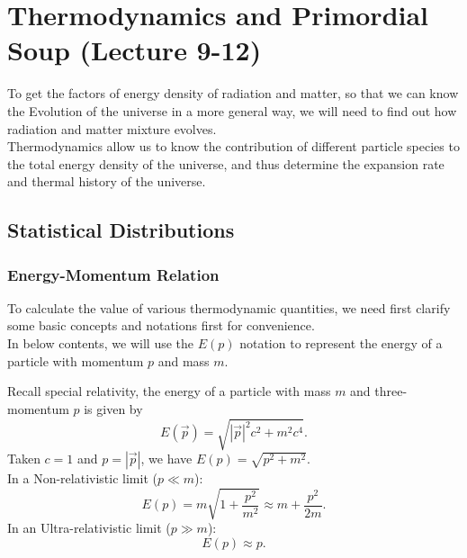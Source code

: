 
\chapter{Thermodynamics and Primordial Soup (Lecture 9-12)}
\quad To get the factors of energy density of radiation and matter, so that we can know the Evolution of the universe in a more general way, we will need to find out how radiation and matter mixture evolves.\\

Thermodynamics allow us to know the contribution of different particle species to the total energy density of the universe, and thus determine the expansion rate and thermal history of the universe.\\

\section{Statistical Distributions}
\subsection{Energy-Momentum Relation}
To calculate the value of various thermodynamic quantities, we need first clarify some basic concepts and notations first for convenience. \\

In below contents, we will use the $E(p)$ notation to represent the energy of a particle with momentum $p$ and mass $m$.
\begin{foundation}
    Recall special relativity, the energy of a particle with mass $m$ and three-momentum $p$ is given by
    \[
        E(\vec{p}) = \sqrt{|\vec{p}|^2c^2 + m^2c^4}.
    \]
    Taken $c = 1$ and $p = |\vec{p}|$, we have $E(p) = \sqrt{p^2 + m^2}$. \\

    In a Non-relativistic limit ($p \ll m$):
    \[
        E(p) = m \sqrt{1 + \frac{p^2}{m^2}} \approx m + \frac{p^2}{2m}.
    \]
    In an Ultra-relativistic limit ($p \gg m$):
    \[
        E(p)  \approx p.
    \]
\end{foundation}

\bigskip\noindent
